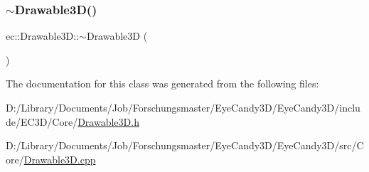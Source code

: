 \mbox{\label{classec_1_1_drawable3_d_a172c8139926fafaf2bb236b8c52b25ab}} 
\subsubsection{\texorpdfstring{$\sim$\+Drawable3\+D()}{~Drawable3D()}}
{\footnotesize\ttfamily ec\+::\+Drawable3\+D\+::$\sim$\+Drawable3D (\begin{DoxyParamCaption}{ }\end{DoxyParamCaption})\hspace{0.3cm}{\ttfamily [virtual]}}



The documentation for this class was generated from the following files\+:\begin{DoxyCompactItemize}
\item 
D\+:/\+Library/\+Documents/\+Job/\+Forschungsmaster/\+Eye\+Candy3\+D/\+Eye\+Candy3\+D/include/\+E\+C3\+D/\+Core/\mbox{\hyperlink{_drawable3_d_8h}{Drawable3\+D.\+h}}\item 
D\+:/\+Library/\+Documents/\+Job/\+Forschungsmaster/\+Eye\+Candy3\+D/\+Eye\+Candy3\+D/src/\+Core/\mbox{\hyperlink{_drawable3_d_8cpp}{Drawable3\+D.\+cpp}}\end{DoxyCompactItemize}
